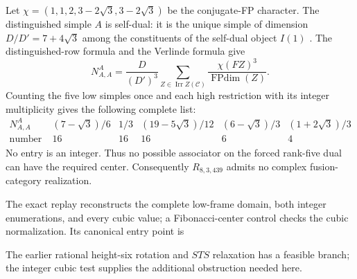 Let $\chi=(1,1,2,3-2\sqrt3,3-2\sqrt3)$ be the conjugate-FP character.
The distinguished simple $A$ is self-dual: it is the unique simple
of dimension $D/D'=7+4\sqrt3$ among the constituents of the
self-dual object $I(1)$ \cite[Theorem~2.13]{OstrikPiv3}.
The distinguished-row formula \cite[equation~(39)]{DeshpandeCenter}
and the Verlinde formula give
\[
 N_{A,A}^{A}=\frac{D}{(D')^3}
       \sum_{Z\in\operatorname{Irr} Z(\mathcal C)}
       \frac{\chi(FZ)^3}{\operatorname{FPdim}(Z)}.
\]
Counting the five low simples once and each high restriction with its
integer multiplicity gives the following complete list:
\[
\begin{array}{c|ccccc}
N_{A,A}^{A}&(7-\sqrt3)/6&1/3&(19-5\sqrt3)/12&(6-\sqrt3)/3&(1+2\sqrt3)/3\\
\text{number of patterns}&16&16&16&6&4
\end{array}
\]
No entry is an integer.  Thus no possible associator on the forced
rank-five dual can have the required center.  Consequently
$R_{8,3,439}$ admits no complex fusion-category realization.

The exact replay reconstructs the complete low-frame domain, both
integer enumerations, and every cubic value; a Fibonacci-center
control checks the cubic normalization.  Its canonical entry point is
\begin{quote}\small{}\end{quote}
The earlier rational height-six rotation and $STS$ relaxation has a
feasible branch; the integer cubic test supplies the additional
obstruction needed here.
